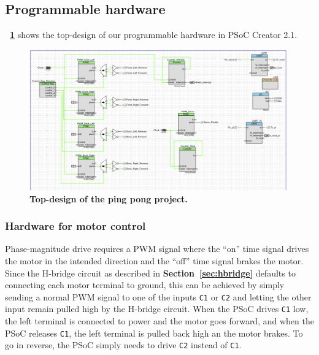 \documentclass[letterpaper, 11pt]{article}
\newcommand*{\figref}[1]{\textbf{\figurename~\ref{#1}}}
\newcommand*{\secref}[1]{\textbf{Section~\ref{#1}}}
\begin{document}
\begin{enumerate}[label=\textbf{\arabic*.}]
\subsection{Programmable hardware}
\figref{fig:topdesign} shows the top-design of our programmable hardware in PSoC Creator 2.1.
\begin{figure}[ht]
    \centering
    \includegraphics[width=0.99\textwidth]{images/topdesign.pdf}
    \caption{\textbf{Top-design of the ping pong project.}}
    \label{fig:topdesign}
\end{figure}

\subsubsection{Hardware for motor control}
\label{sec:prog-hard-motor}
Phase-magnitude drive requires a PWM signal where the ``on'' time signal drives the motor in the intended direction and the ``off'' time signal brakes the motor. Since the H-bridge circuit as described in \secref{sec:hbridge} defaults to connecting each motor terminal to ground, this can be achieved by simply sending a normal PWM signal to one of the inputs \texttt{C1} or \texttt{C2} and letting the other input remain pulled high by the H-bridge circuit. When the PSoC drives \texttt{C1} low, the left terminal is connected to power and the motor goes forward, and when the PSoC releases \texttt{C1}, the left terminal is pulled back high an the motor brakes. To go in reverse, the PSoC simply needs to drive \texttt{C2} instead of \texttt{C1}.


\end{enumerate}
\end{document}
